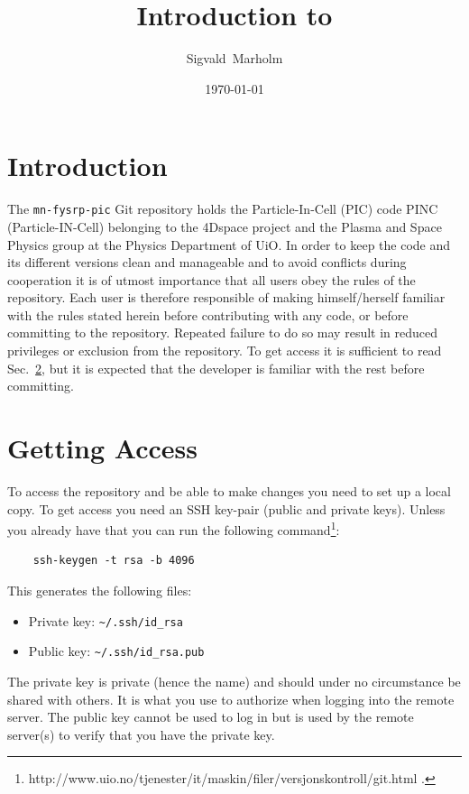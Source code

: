 \documentclass[10pt,a4paper]{article}
\author{Sigvald~Marholm}
\title{Introduction to \mnfysrppic}
\date{\today}
\newcommand{\mnfysrppic}{\texttt{mn-fysrp-pic}}
\newcommand{\refsec}[1]{Sec.~\ref{sec:#1}}
\begin{document}
\maketitle
\newpage

\section{Introduction}
The \mnfysrppic{} Git repository holds the Particle-In-Cell (PIC) code PINC (Particle-IN-Cell) belonging to the 4Dspace project and the Plasma and Space Physics group at the Physics Department of UiO. In order to keep the code and its different versions clean and manageable and to avoid conflicts during cooperation it is of utmost importance that all users obey the rules of the repository. Each user is therefore responsible of making himself/herself familiar with the rules stated herein before contributing with any code, or before committing to the repository. Repeated failure to do so may result in reduced privileges or exclusion from the repository. To get access it is sufficient to read \refsec{access}, but it is expected that the developer is familiar with the rest before committing.



\section{Getting Access}\label{sec:access}
To access the repository and be able to make changes you need to set up a local copy. To get access you need an SSH key-pair (public and private keys). Unless you already have that you can run the following command\footnote{http://www.uio.no/tjenester/it/maskin/filer/versjonskontroll/git.html .}:

\begin{verbatim}
	ssh-keygen -t rsa -b 4096
\end{verbatim}
This generates the following files:

\begin{itemize}
	\item Private key: \verb$~/.ssh/id_rsa$
	\item Public key: \verb$~/.ssh/id_rsa.pub$
\end{itemize}
The private key is private (hence the name) and should under no circumstance be shared with others. It is what you use to authorize when logging into the remote server. The public key cannot be used to log in but is used by the remote server(s) to verify that you have the private key.
\end{document}
